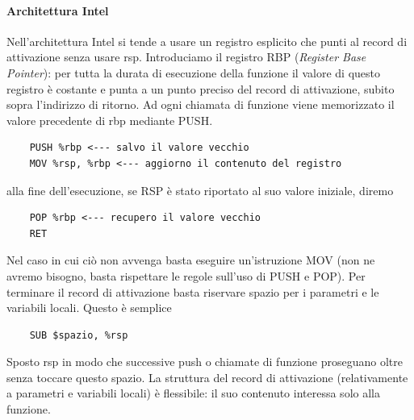 \paragraph{Architettura Intel} Nell'architettura Intel si tende a usare un registro esplicito che punti al record di attivazione senza usare rsp. Introduciamo il registro RBP (\emph{Register Base Pointer}): per tutta la durata di esecuzione della funzione il valore di questo registro è costante e punta a un punto preciso del record di attivazione, subito sopra l'indirizzo di ritorno. Ad ogni chiamata di funzione viene memorizzato il valore precedente di rbp mediante PUSH.
\begin{verbatim}
	PUSH %rbp <--- salvo il valore vecchio 
	MOV %rsp, %rbp <--- aggiorno il contenuto del registro
\end{verbatim}
alla fine dell'esecuzione, se RSP è stato riportato al suo valore iniziale, diremo
\begin{verbatim}
	POP %rbp <--- recupero il valore vecchio 
	RET
\end{verbatim}
Nel caso in cui ciò non avvenga basta eseguire un'istruzione MOV (non ne avremo bisogno, basta rispettare le regole sull'uso di PUSH e POP). Per terminare il record di attivazione basta riservare spazio per i parametri e le variabili locali. Questo è semplice
\begin{verbatim}
	SUB $spazio, %rsp
\end{verbatim}
Sposto rsp in modo che successive push o chiamate di funzione proseguano oltre senza toccare questo spazio. La struttura del record di attivazione (relativamente a parametri e variabili locali) è flessibile: il suo contenuto interessa solo alla funzione.

